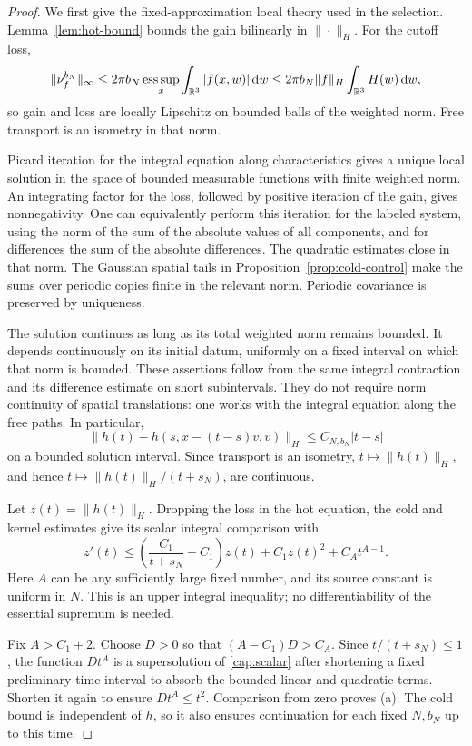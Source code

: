 \begin{proof}
We first give the fixed-approximation local theory used in the selection.
Lemma~\ref{lem:hot-bound} bounds the gain bilinearly in \(\|\cdot\|_H\).
For the cutoff loss,
\[
\|\nu_f^{b_N}\|_\infty
 \le2\pi b_N\operatorname*{ess\,sup}_x\int_{\mathbb R^3}|f(x,w)|\,\mathrm d w
 \le2\pi b_N\|f\|_H\int_{\mathbb R^3}H(w)\,\mathrm d w,
\]
so gain and loss are locally Lipschitz on bounded
balls of the weighted norm. Free transport is an isometry in that norm.

Picard iteration for the integral equation along characteristics gives
a unique local solution in the space of bounded measurable functions
with finite weighted norm. An integrating factor for the loss, followed
by positive iteration of the gain, gives nonnegativity. One can equivalently
perform this iteration for the labeled system, using the norm of the sum
of the absolute values of all components, and for differences the sum of
the absolute differences. The quadratic estimates close in that norm.
The Gaussian spatial tails in Proposition~\ref{prop:cold-control} make
the sums over periodic copies finite in the relevant norm. Periodic
covariance is preserved by uniqueness.

The solution continues as long as its total weighted norm remains
bounded. It depends continuously on its initial datum, uniformly on
a fixed interval on which that norm is bounded. These assertions follow
from the same integral contraction and its difference estimate on short
subintervals. They do not require norm continuity of spatial translations:
one works with the integral equation along the free paths.
In particular,
\[
\|h(t)-h(s,x-(t-s)v,v)\|_H\le C_{N,b_N}|t-s|
\]
on a bounded solution interval. Since transport is an isometry,
\(t\mapsto\|h(t)\|_H\), and hence \(t\mapsto\|h(t)\|_H/(t+s_N)\),
are continuous.

Let \(z(t)=\|h(t)\|_H\). Dropping the loss in the hot equation,
the cold and kernel estimates give its scalar integral comparison with
\begin{equation}\label{cap:scalar}
z'(t)\le
 \left(\frac{C_1}{t+s_N}+C_1\right)z(t)+C_1z(t)^2+C_A t^{A-1}.
\end{equation}
Here \(A\) can be any sufficiently large fixed number, and its source
constant is uniform in \(N\). This is an upper integral inequality;
no differentiability of the essential supremum is needed.

Fix \(A>C_1+2\). Choose \(D>0\) so that
\((A-C_1)D>C_A\). Since \(t/(t+s_N)\le1\), the function \(Dt^A\)
is a supersolution of \eqref{cap:scalar} after shortening a fixed
preliminary time interval to absorb the bounded linear and quadratic
terms. Shorten it again to ensure \(Dt^A\le t^2\). Comparison from
zero proves (a). The cold bound is independent of \(h\), so it also
ensures continuation for each fixed \(N,b_N\) up to this time.


\end{proof}
